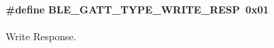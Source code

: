\paragraph[{\texorpdfstring{B\+L\+E\+\_\+\+G\+A\+T\+T\+\_\+\+T\+Y\+P\+E\+\_\+\+W\+R\+I\+T\+E\+\_\+\+R\+E\+SP}{BLE_GATT_TYPE_WRITE_RESP}}]{\setlength{\rightskip}{0pt plus 5cm}\#define B\+L\+E\+\_\+\+G\+A\+T\+T\+\_\+\+T\+Y\+P\+E\+\_\+\+W\+R\+I\+T\+E\+\_\+\+R\+E\+SP~0x01}\hypertarget{group___b_l_e___g_a_t_t___w_r_i_t_e___r_e_s_p___t_y_p_e_s_ga121d15d58b1a67e7a6a9e1be908b43f2}{}\label{group___b_l_e___g_a_t_t___w_r_i_t_e___r_e_s_p___t_y_p_e_s_ga121d15d58b1a67e7a6a9e1be908b43f2}
Write Response. 